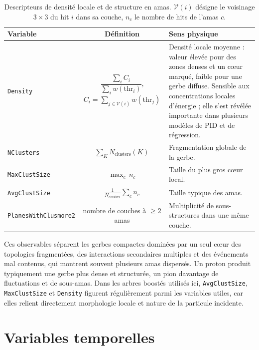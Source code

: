 \begin{table}[!ht]
    \centering
    \caption{Descripteurs de densité locale et de structure en amas. \(\mathcal{V}(i)\) désigne le
             voisinage \(3\times3\) du hit \(i\) dans sa couche, \(n_c\) le nombre de hits de
             l'amas \(c\).}
    \label{tab:annexeA-density}
    \small
    \begin{tabularx}{\textwidth}{@{}l c X@{}}
        \toprule
        \textbf{Variable} & \textbf{Définition} & \textbf{Sens physique} \\
        \midrule
        \texttt{Density}
            & \(\dfrac{\sum_i C_i}{\sum_i w(\mathrm{thr}_i)}\),\quad
              \(C_i=\sum_{j\in \mathcal{V}(i)} w(\mathrm{thr}_j)\)
            & Densité locale moyenne : valeur élevée pour des zones denses et un cœur marqué,
              faible pour une gerbe diffuse. Sensible aux concentrations locales d'énergie ; elle
              s'est révélée importante dans plusieurs modèles de PID et de régression. \\[4pt]
        \texttt{NClusters}
            & \(\sum_K N_{\mathrm{clusters}}(K)\)
            & Fragmentation globale de la gerbe. \\[2pt]
        \texttt{MaxClustSize}
            & \(\max_c\, n_c\)
            & Taille du plus gros cœur local. \\[2pt]
        \texttt{AvgClustSize}
            & \(\tfrac{1}{N_{\mathrm{clusters}}}\sum_c n_c\)
            & Taille typique des amas. \\[2pt]
        \texttt{PlanesWithClusmore2}
            & nombre de couches à \(\ge 2\) amas
            & Multiplicité de sous-structures dans une même couche. \\
        \bottomrule
    \end{tabularx}
\end{table}

Ces observables séparent les gerbes compactes dominées par un seul cœur des topologies fragmentées, des interactions secondaires multiples et des événements mal contenus, qui montrent souvent plusieurs amas dispersés. Un proton produit typiquement une gerbe plus dense et structurée, un pion davantage de fluctuations et de sous-amas. Dans les arbres boostés utilisés ici, \texttt{AvgClustSize}, \texttt{MaxClustSize} et \texttt{Density} figurent régulièrement parmi les variables utiles, car elles relient directement morphologie locale et nature de la particule incidente.

\section{Variables temporelles}
\label{annexe:timevars}

